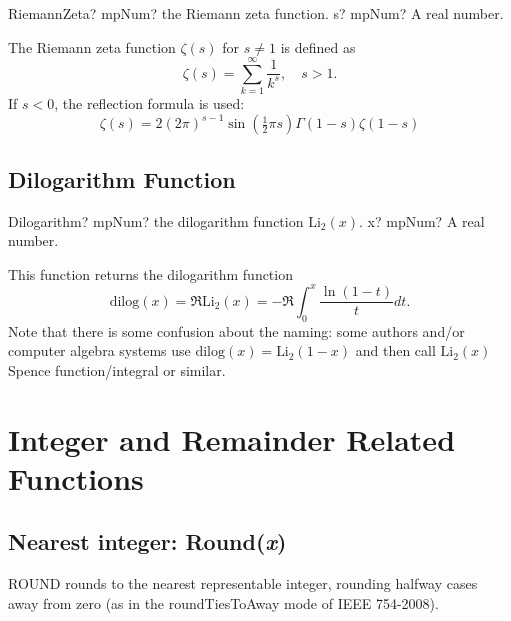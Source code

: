 \begin{mpFunctionsExtract}
	\mpFunctionOne
	{RiemannZeta? mpNum? the Riemann zeta function.}
	{s? mpNum? A real number.}
\end{mpFunctionsExtract}

\vspace{0.3cm}
The Riemann zeta function $\zeta(s)$ for $s \neq 1$ is defined as
\begin{equation}
	\zeta(s) = \sum_{k=1}^\infty \frac{1}{k^s}, \quad s>1.
\end{equation}
If $s<0$, the reflection formula is used:
\begin{equation}
	\zeta(s) = 2(2\pi)^{s-1} \sin\left(\tfrac{1}{2} \pi s\right) \Gamma(1-s) \zeta(1-s)
\end{equation}



\subsection{Dilogarithm Function}
\label{DiGammaFunction}

\begin{mpFunctionsExtract}
	\mpFunctionOne
	{Dilogarithm? mpNum? the dilogarithm function $\text{Li}_2(x)$.}
	{x? mpNum? A real number.}
\end{mpFunctionsExtract}


\vspace{0.3cm}
This function returns the dilogarithm function
\begin{equation}
	\text{dilog}(x) = \Re \text{Li}_2(x) = -\Re \int_0^x \frac{\ln(1-t)}{t}dt.
\end{equation}
Note that there is some confusion about the naming: some authors and/or computer algebra systems use $\text{dilog}(x) = \text{Li}_2(1-x)$ and then call $\text{Li}_2(x)$ Spence function/integral or similar.





\section{Integer and Remainder Related Functions}
\label{IntegerandRemainderRelatedFunctions}


\subsection{Nearest integer: Round(\textit{x})}


ROUND rounds to the nearest representable integer, rounding halfway cases away from zero (as in the roundTiesToAway mode of IEEE 754-2008).

